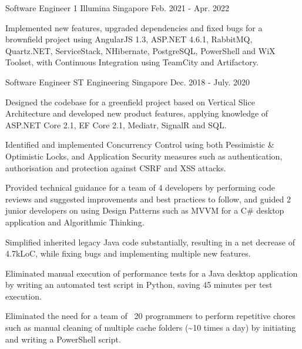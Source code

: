 \begin{cventries}
\cventry
{Software Engineer 1} %
{Illumina} %
{Singapore} %
{Feb. 2021 - Apr. 2022} %
{
  \begin{cvitems} %
    \item {Implemented new features, upgraded dependencies and fixed bugs for a brownfield project using AngularJS 1.3, ASP.NET 4.6.1, RabbitMQ, Quartz.NET, ServiceStack, NHibernate, PostgreSQL, PowerShell and WiX Toolset, with Continuous Integration using TeamCity and Artifactory.}
  \end{cvitems}
}

  \cventry
    {Software Engineer} %
    {ST Engineering} %
    {Singapore} %
    {Dec. 2018 - July. 2020} %
    {
      \begin{cvitems} %
        \item {Designed the codebase for a greenfield project based on Vertical Slice Architecture and developed new product features, applying knowledge of ASP.NET Core 2.1, EF Core 2.1, Mediatr, SignalR and SQL.}
        \item {Identified and implemented Concurrency Control using both Pessimistic \& Optimistic Locks, and Application Security measures such as authentication, authorisation and protection against CSRF and XSS attacks.}
        \item {Provided technical guidance for a team of 4 developers by performing code reviews and suggested improvements and best practices to follow, and guided 2 junior developers on using Design Patterns such as MVVM for a C\# desktop application and Algorithmic Thinking.}
        \item {Simplified inherited legacy Java code substantially, resulting in a net decrease of 4.7kLoC, while fixing bugs and implementing multiple new features.}
        \item {Eliminated manual execution of performance tests for a Java desktop application by writing an automated test script in Python, saving 45 minutes per test execution.}
        \item {Eliminated the need for a team of ~20 programmers to perform repetitive chores such as manual cleaning of multiple cache folders (\textasciitilde10 times a day) by initiating and writing a PowerShell script.}
      \end{cvitems}
    }


\end{cventries}
